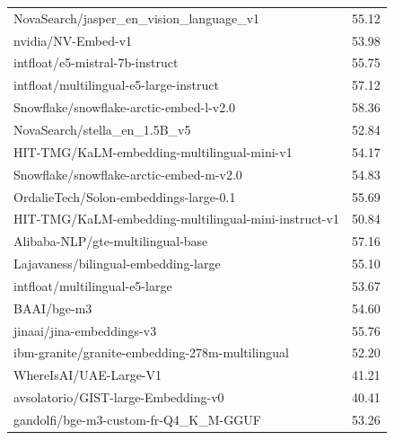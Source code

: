 \begin{xltabular}{\textwidth}{X c}
    NovaSearch/jasper\_en\_vision\_language\_v1                          & 55.12                    \\
    nvidia/NV-Embed-v1                                                   & 53.98                    \\
    intfloat/e5-mistral-7b-instruct                                      & 55.75                    \\
    intfloat/multilingual-e5-large-instruct                              & 57.12                    \\
    Snowflake/snowflake-arctic-embed-l-v2.0                              & 58.36                    \\
    NovaSearch/stella\_en\_1.5B\_v5                                      & 52.84                    \\
    HIT-TMG/KaLM-embedding-multilingual-mini-v1                          & 54.17                    \\
    Snowflake/snowflake-arctic-embed-m-v2.0                              & 54.83                    \\
    OrdalieTech/Solon-embeddings-large-0.1                               & 55.69                    \\
    HIT-TMG/KaLM-embedding-multilingual-mini-instruct-v1                 & 50.84                    \\
    Alibaba-NLP/gte-multilingual-base                                    & 57.16                    \\
    Lajavaness/bilingual-embedding-large                                 & 55.10                    \\
    intfloat/multilingual-e5-large                                       & 53.67                    \\
    BAAI/bge-m3                                                          & 54.60                    \\
    jinaai/jina-embeddings-v3                                            & 55.76                    \\
    ibm-granite/granite-embedding-278m-multilingual                      & 52.20                    \\
    WhereIsAI/UAE-Large-V1                                               & 41.21                    \\
    avsolatorio/GIST-large-Embedding-v0                                  & 40.41                    \\
    gandolfi/bge-m3-custom-fr-Q4\_K\_M-GGUF                              & 53.26                    \\

\end{xltabular}

